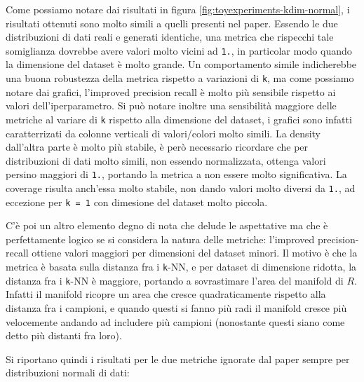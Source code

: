 Come possiamo notare dai risultati in figura \ref{fig:toyexperiments-kdim-normal}, i risultati ottenuti sono molto simili a quelli presenti nel paper. Essendo le due distribuzioni di dati reali e generati identiche, una metrica che rispecchi tale somiglianza dovrebbe avere valori molto vicini ad \texttt{1.}, in particolar modo quando la dimensione del dataset è molto grande.
Un comportamento simile indicherebbe una buona robustezza della metrica rispetto a variazioni di \texttt{k}, ma come possiamo notare dai grafici, l'improved precision recall è molto più sensibile rispetto ai valori dell'iperparametro. 
Si può notare inoltre una sensibilità maggiore delle metriche al variare di \texttt{k} rispetto alla dimensione del dataset, i grafici sono infatti caratterrizati da colonne verticali di valori/colori molto simili.
La density dall'altra parte è molto più stabile, è però necessario ricordare che per distribuzioni di dati molto simili, non essendo normalizzata, ottenga valori persino maggiori di \texttt{1.}, portando la metrica a non essere molto significativa.
La coverage risulta anch'essa molto stabile, non dando valori molto diversi da \texttt{1.}, ad eccezione per \texttt{k = 1} con dimesione del dataset molto piccola.

C'è poi un altro elemento degno di nota che delude le aspettative ma che è perfettamente logico se si considera la natura delle metriche: l'improved precision-recall ottiene valori maggiori per dimensioni del dataset minori. Il motivo è che la metrica è basata sulla distanza fra i \texttt{k}-NN, e per dataset di dimensione ridotta, la distanza fra i \texttt{k}-NN è maggiore, portando a sovrastimare l'area del manifold di \(R\). Infatti il manifold ricopre un area che cresce quadraticamente rispetto alla distanza fra i campioni, e quando questi si fanno più radi il manifold cresce più velocemente andando ad includere più campioni (nonostante questi siano come detto più distanti fra loro).

Si riportano quindi i risultati per le due metriche ignorate dal paper sempre per distribuzioni normali di dati:

